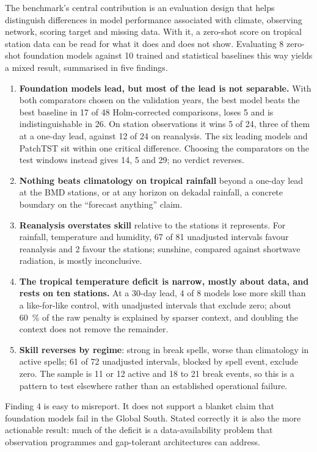 The benchmark's central contribution is an evaluation design that helps distinguish differences in model
performance associated with climate, observing network, scoring target and missing data. With it, a zero-shot score on tropical station data can be read for what it does and does not show. Evaluating 8 zero-shot foundation models against 10
trained and statistical baselines this way yields a mixed result, summarised in five findings.

\begin{enumerate}
  \item \textbf{Foundation models lead, but most of the lead is not separable.} With both comparators chosen on
    the validation years, the best model beats the best baseline in 17 of 48 Holm-corrected comparisons, loses 5
    and is indistinguishable in 26. On station observations it wins 5 of 24, three of them at a one-day lead,
    against 12 of 24 on reanalysis. The six leading models and PatchTST sit within one critical difference.
    Choosing the comparators on the test windows instead gives 14, 5 and 29; no verdict reverses.
  \item \textbf{Nothing beats climatology on tropical rainfall} beyond a one-day lead at the BMD stations, or at
    any horizon on dekadal rainfall, a concrete boundary on the ``forecast anything'' claim.
  \item \textbf{Reanalysis overstates skill} relative to the stations it represents. For rainfall, temperature and
    humidity, 67 of 81 unadjusted intervals favour reanalysis and 2 favour the stations; sunshine, compared against
    shortwave radiation, is mostly inconclusive.
  \item \textbf{The tropical temperature deficit is narrow, mostly about data, and rests on ten stations.} At a 30-day lead, 4 of 8 models
    lose more skill than a like-for-like control, with unadjusted intervals that exclude zero; about
    \SI{60}{\percent} of the raw penalty is explained by sparser context, and doubling the context does not remove
    the remainder.
  \item \textbf{Skill reverses by regime}: strong in break spells, worse than climatology in active spells; 61 of
    72 unadjusted intervals, blocked by spell event, exclude zero. The sample is 11 or 12 active and 18 to 21 break
    events, so this is a pattern to test elsewhere rather than an established operational failure.
\end{enumerate}

Finding 4 is easy to misreport. It does not support a blanket claim that foundation models fail in the Global
South. Stated correctly it is also the more actionable result: much of the deficit is a data-availability problem
that observation programmes and gap-tolerant architectures can address.

